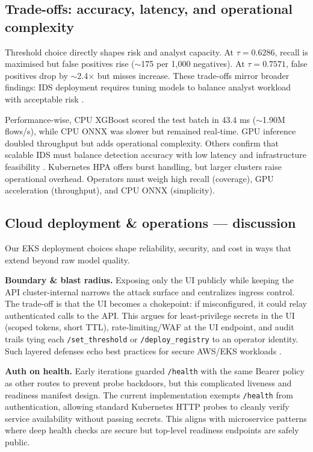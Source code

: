 \documentclass{article}
\begin{document}
\subsection{Trade-offs: accuracy, latency, and operational complexity}
Threshold choice directly shapes risk and analyst capacity. At $\tau = 0.6286$, recall is maximised but false positives rise ($\sim$175 per 1,000 negatives). At $\tau = 0.7571$, false positives drop by $\sim$2.4$\times$ but misses increase. These trade-offs mirror broader findings: IDS deployment requires tuning models to balance analyst workload with acceptable risk \cite{merlin2024}.

Performance-wise, CPU XGBoost scored the test batch in 43.4 ms ($\sim$1.90M flows/s), while CPU ONNX was slower but remained real-time. GPU inference doubled throughput but adds operational complexity. Others confirm that scalable IDS must balance detection accuracy with low latency and infrastructure feasibility \cite{jose2024, prasad2022}. Kubernetes HPA offers burst handling, but larger clusters raise operational overhead. Operators must weigh high recall (coverage), GPU acceleration (throughput), and CPU ONNX (simplicity).

\subsection{Cloud deployment \& operations — discussion}
Our EKS deployment choices shape reliability, security, and cost in ways that extend beyond raw model quality.

\textbf{Boundary \& blast radius.} Exposing only the UI publicly while keeping the API cluster-internal narrows the attack surface and centralizes ingress control. The trade-off is that the UI becomes a chokepoint: if misconfigured, it could relay authenticated calls to the API. This argues for least-privilege secrets in the UI (scoped tokens, short TTL), rate-limiting/WAF at the UI endpoint, and audit trails tying each \texttt{/set\_threshold} or \texttt{/deploy\_registry} to an operator identity. Such layered defenses echo best practices for secure AWS/EKS workloads \cite{algarni2021}.

\textbf{Auth on health.} Early iterations guarded \texttt{/health} with the same Bearer policy as other routes to prevent probe backdoors, but this complicated liveness and readiness manifest design. The current implementation exempts \texttt{/health} from authentication, allowing standard Kubernetes HTTP probes to cleanly verify service availability without passing secrets. This aligns with microservice patterns where deep health checks are secure but top-level readiness endpoints are safely public.
\end{document}
